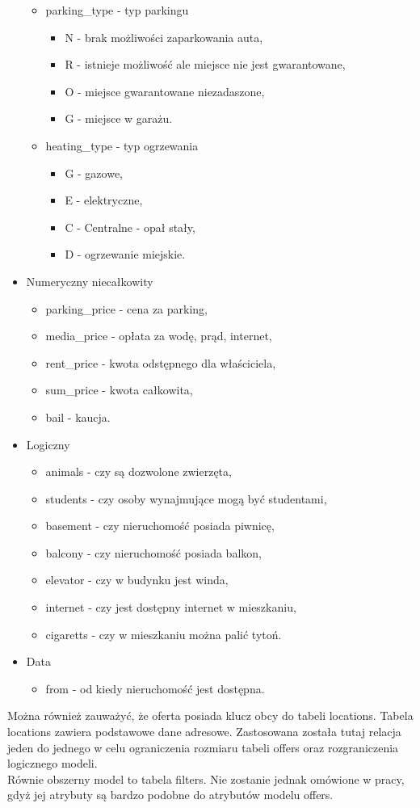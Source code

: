 \begin{itemize}
\begin{itemize}
\item parking\_type - typ parkingu
\begin{itemize}
\item N - brak możliwości zaparkowania auta,
\item R - istnieje możliwość ale miejsce nie jest gwarantowane,
\item O - miejsce gwarantowane niezadaszone,
\item G - miejsce w garażu.
\end{itemize} 
\item heating\_type - typ ogrzewania
\begin{itemize}
\item G - gazowe,
\item E - elektryczne,
\item C - Centralne - opał stały,
\item D - ogrzewanie miejskie.
\end{itemize}
\end{itemize}
\item Numeryczny niecałkowity
\begin{itemize}
\item parking\_price - cena za parking,
\item media\_price - opłata za wodę, prąd, internet,
\item rent\_price - kwota odstępnego dla właściciela,
\item sum\_price - kwota całkowita,
\item bail - kaucja.
\end{itemize}
\item Logiczny
\begin{itemize}
\item animals - czy są dozwolone zwierzęta,
\item students - czy osoby wynajmujące mogą być studentami,
\item basement - czy nieruchomość posiada piwnicę,
\item balcony - czy nieruchomość posiada balkon,
\item elevator - czy w budynku jest winda,
\item internet - czy jest dostępny internet w mieszkaniu,
\item cigaretts - czy w mieszkaniu można palić tytoń.
\end{itemize}
\item Data
\begin{itemize}
\item from - od kiedy nieruchomość jest dostępna.
\end{itemize}
\end{itemize} 
Można również zauważyć, że oferta posiada klucz obcy do tabeli locations. Tabela locations zawiera podstawowe dane adresowe. Zastosowana została tutaj relacja jeden do jednego w celu ograniczenia rozmiaru tabeli offers oraz rozgraniczenia logicznego modeli.\\
Równie obszerny model to tabela filters. Nie zostanie jednak omówione w pracy, gdyż jej atrybuty są bardzo podobne do atrybutów modelu offers.
